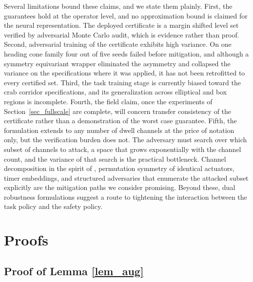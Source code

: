 \documentclass[journal]{IEEEtran}
\begin{document}
Several limitations bound these claims, and we state them plainly. First, the guarantees hold at the operator level, and no approximation bound is claimed for the neural representation. The deployed certificate is a margin shifted level set verified by adversarial Monte Carlo audit, which is evidence rather than proof. Second, adversarial training of the certificate exhibits high variance. On one heading cone family four out of five seeds failed before mitigation, and although a symmetry equivariant wrapper eliminated the asymmetry and collapsed the variance on the specifications where it was applied, it has not been retrofitted to every certified set. Third, the task training stage is currently biased toward the crab corridor specifications, and its generalization across elliptical and box regions is incomplete. Fourth, the field claim, once the experiments of Section~\ref{sec_fullscale} are complete, will concern transfer consistency of the certificate rather than a demonstration of the worst case guarantee. Fifth, the formulation extends to any number of dwell channels at the price of notation only, but the verification burden does not. The adversary must search over which subset of channels to attack, a space that grows exponentially with the channel count, and the variance of that search is the practical bottleneck. Channel decomposition in the spirit of \cite{li2311decomp}, permutation symmetry of identical actuators, timer embeddings, and structured adversaries that enumerate the attacked subset explicitly are the mitigation paths we consider promising. Beyond these, dual robustness formulations \cite{li2309dual} suggest a route to tightening the interaction between the task policy and the safety policy.

\appendices

\section{Proofs}\label{app_proofs}

\subsection{Proof of Lemma \ref{lem_aug}}
\end{document}
